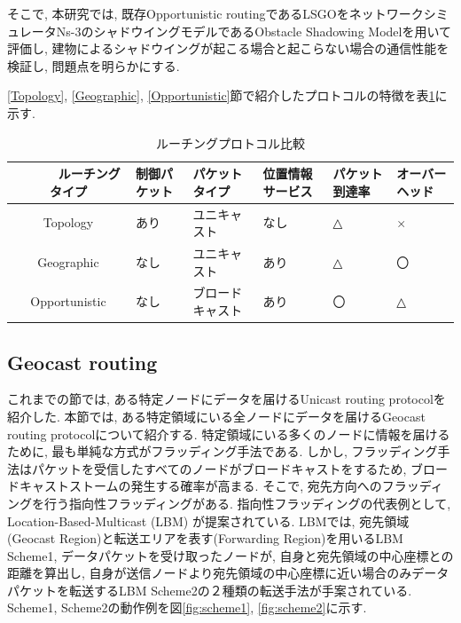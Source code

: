 \documentclass[10pt]{jreport}
\begin{document}
そこで, 本研究では, 既存Opportunistic routingであるLSGOをネットワークシミュレータNs-3\cite{19}のシャドウイングモデルであるObstacle Shadowing Model\cite{20}を用いて評価し, 建物によるシャドウイングが起こる場合と起こらない場合の通信性能を検証し, 問題点を明らかにする.

\ref{Topology}, \ref{Geographic}, \ref{Opportunistic}節で紹介したプロトコルの特徴を表\ref{tab:protocol}に示す.

\begin{table}[h]
	\begin{center}
	\caption{ルーチングプロトコル比較}
	\label{tab:protocol}
	\centering
	\begin{tabular}{clllll}
		\hline
	　　　 ルーチングタイプ & 制御パケット & パケットタイプ & 位置情報サービス & パケット到達率 & オーバーヘッド \\
		\hline \hline
		Topology & あり & ユニキャスト & なし  & △ & × \\
		Geographic  & なし & ユニキャスト & あり   & △ & 〇 \\
		Opportunistic & なし & ブロードキャスト & あり   & 〇 & △ \\
		\hline
	\end{tabular}
	\end{center}
\end{table}




\subsection{Geocast routing}
これまでの節では, ある特定ノードにデータを届けるUnicast routing protocolを紹介した.
本節では, ある特定領域にいる全ノードにデータを届けるGeocast routing protocol\cite{Geocast}について紹介する.
特定領域にいる多くのノードに情報を届けるために, 最も単純な方式がフラッディング手法である.
しかし, フラッディング手法はパケットを受信したすべてのノードがブロードキャストをするため, ブロードキャストストームの発生する確率が高まる.
そこで, 宛先方向へのフラッディングを行う指向性フラッディングがある. 指向性フラッディングの代表例として, Location-Based-Multicast (LBM) \cite{LBM}が提案されている.
LBMでは, 宛先領域(Geocast Region)と転送エリアを表す(Forwarding Region)を用いるLBM Scheme1, データパケットを受け取ったノードが, 自身と宛先領域の中心座標との距離を算出し, 自身が送信ノードより宛先領域の中心座標に近い場合のみデータパケットを転送するLBM Scheme2の２種類の転送手法が手案されている.
Scheme1, Scheme2の動作例を図\ref{fig:scheme1}, \ref{fig:scheme2}に示す.
\end{document}

